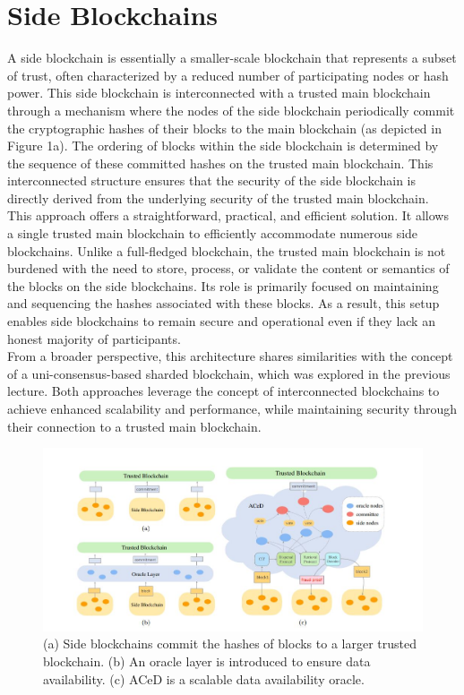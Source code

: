 \documentclass{report}
\begin{document}
\section{Side Blockchains}
A side blockchain is essentially a smaller-scale blockchain that represents a subset of trust, often characterized by a reduced number of participating nodes or hash power. This side blockchain is interconnected with a trusted main blockchain through a mechanism where the nodes of the side blockchain periodically commit the cryptographic hashes of their blocks to the main blockchain (as depicted in Figure 1a). The ordering of blocks within the side blockchain is determined by the sequence of these committed hashes on the trusted main blockchain. This interconnected structure ensures that the security of the side blockchain is directly derived from the underlying security of the trusted main blockchain.\\
This approach offers a straightforward, practical, and efficient solution. It allows a single trusted main blockchain to efficiently accommodate numerous side blockchains. Unlike a full-fledged blockchain, the trusted main blockchain is not burdened with the need to store, process, or validate the content or semantics of the blocks on the side blockchains. Its role is primarily focused on maintaining and sequencing the hashes associated with these blocks. As a result, this setup enables side blockchains to remain secure and operational even if they lack an honest majority of participants. \\
From a broader perspective, this architecture shares similarities with the concept of a uni-consensus-based sharded blockchain, which was explored in the previous lecture. Both approaches leverage the concept of interconnected blockchains to achieve enhanced scalability and performance, while maintaining security through their connection to a trusted main blockchain.
\begin{center}
	\begin{figure}
		\centering
		\includegraphics[width=0.8\linewidth]{Fig/F1}
		\caption{(a) Side blockchains commit the hashes of blocks to a larger trusted blockchain. (b) An oracle layer is introduced to ensure data availability. (c) ACeD is a scalable data availability oracle.
		}
		\label{fig:f1}
	\end{figure}
\end{center}
\end{document}
